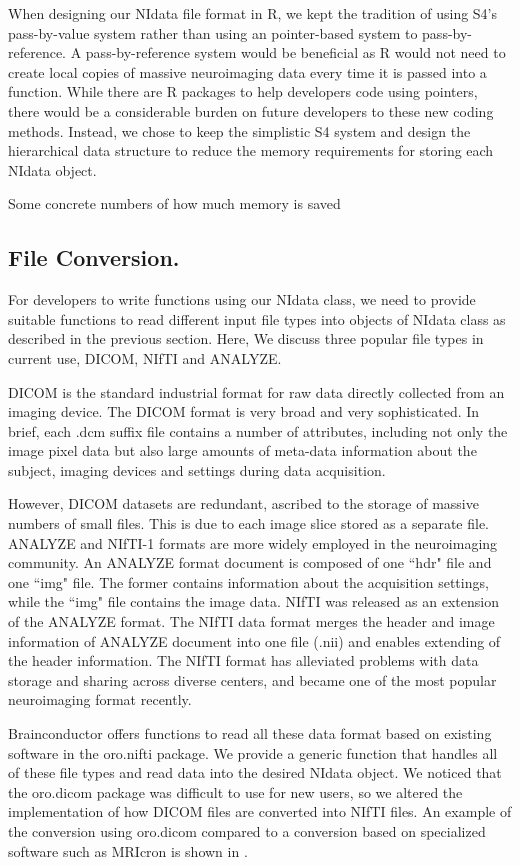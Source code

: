 \documentclass{nature}
\begin{document}
When designing our NIdata file format in R, we kept the tradition of using S4's
pass-by-value system rather than using an pointer-based system to
pass-by-reference.
A pass-by-reference system would be beneficial as R would not need to 
create local copies of massive neuroimaging data every time it is passed into a
function. While there are R packages to help developers
code using pointers\cite{bengtsson2003r}, there would be a 
considerable burden on future developers to these new coding methods.
Instead, we chose to keep the simplistic S4 system and design the hierarchical
data structure to reduce the memory requirements for storing each NIdata object.

{\color{red}Some concrete numbers of how much memory is saved}

\subsection{File Conversion.}
For developers to write functions using our NIdata class, we need to provide
suitable functions to read different input file types into objects of NIdata
class as described in the previous section. Here, We discuss three popular file
types in current use, DICOM, NIfTI and ANALYZE.

DICOM is the standard industrial
format for raw data directly collected from an imaging device. The DICOM format
is very broad and very sophisticated. In brief, each .dcm suffix file contains a
number of attributes, including not only the image pixel data but also large
amounts of meta-data information about the subject, imaging devices and settings
during data acquisition.

However, DICOM datasets are redundant, ascribed to the storage of massive
numbers of small files. This is due to each image slice stored as a separate
file. ANALYZE and NIfTI-1 formats are more widely employed in the neuroimaging
community. An ANALYZE format document is composed of one ``hdr" file and one
``img" file. The former contains information about the acquisition settings,
while the ``img" file contains the image data. NIfTI was released as an
extension
of the ANALYZE format. The NIfTI data format merges the header and image
information of ANALYZE document into one file (.nii) and enables extending of
the header information. The NIfTI format has alleviated problems with data
storage and sharing across diverse centers, and became one of the most popular
neuroimaging format recently.

Brainconductor offers functions to read all these data format
based on existing software in the oro.nifti package. We
provide a generic function that handles all of these file types and read data
into the desired NIdata object.
We noticed that the oro.dicom package was difficult to use for new users, so
we altered the implementation of how DICOM files are converted into NIfTI 
files. An example of the conversion using oro.dicom compared to a conversion
based on specialized software such as MRIcron\cite{rorden2011mricro} is
shown in .
\end{document}
